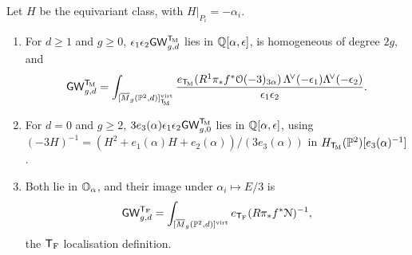 \begin{prop}
\label{prop:gen-poly}
Let $H$ be the equivariant class, with $H|_{P_i}=-\alpha_i$.
\begin{enumerate}
\item For $d\geq1$ and $g\geq0$, $\epsilon_1\epsilon_2\mathsf{GW}_{g,d}^{\mathsf{T}_{\!\mathrm{M}}}$ lies in $\mathbb{Q}[\alpha,\epsilon]$, is homogeneous of degree $2g$, and
\[
\mathsf{GW}_{g,d}^{\mathsf{T}_{\!\mathrm{M}}}=\int_{[\overline{M}_g(\mathbb{P}^2,d)]^{\mathrm{virt}}_{\mathsf{T}_{\!\mathrm{M}}}}\frac{e_{\mathsf{T}_{\!\mathrm{M}}}(R^1\pi_*f^*\mathcal{O}(-3)_{3\alpha})\,\Lambda^{\!\vee}(-\epsilon_1)\Lambda^{\!\vee}(-\epsilon_2)}{\epsilon_1\epsilon_2}.
\]
\item For $d=0$ and $g\geq2$, $3e_3(\alpha)\epsilon_1\epsilon_2\mathsf{GW}_{g,0}^{\mathsf{T}_{\!\mathrm{M}}}$ lies in $\mathbb{Q}[\alpha,\epsilon]$, using $(-3H)^{-1}=(H^2+e_1(\alpha)H+e_2(\alpha))/(3e_3(\alpha))$ in $H_{\mathsf{T}_{\!\mathrm{M}}}(\mathbb{P}^2)[e_3(\alpha)^{-1}]$.
\item Both lie in $\mathbb{O}_{\alpha}$, and their image under $\alpha_i\mapsto E/3$ is
\[
\mathsf{GW}_{g,d}^{\mathsf{T}_{\mathrm{F}}}=\int_{[\overline{M}_g(\mathbb{P}^2,d)]^{\mathrm{virt}}}e_{\mathsf{T}_{\mathrm{F}}}(R\pi_*f^*\mathcal{N})^{-1},
\]
the $\mathsf{T}_{\mathrm{F}}$ localisation definition.
\end{enumerate}
\end{prop}
